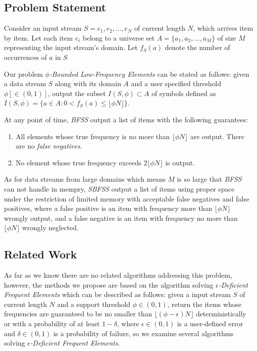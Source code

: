 \documentclass[conference]{IEEEtran}
\begin{document}
\subsection{Problem Statement}
Consider an input stream $S = e_1,e_2,..., e_N$ of current length $N$, which arrives item by item. Let each item $e_i$ belong to a universe set $A=\{a_1,a_2,...,a_M\}$ of size $M$ representing the input stream's domain. Let $f_S(a)$ denote the number of occurrences of $a$ in $S$\par

Our problem $\phi$\emph{-Bounded Low-Frequency Elements} can be stated as follows: given a data stream $S$ along with its domain $A$ and a user specified threshold $\phi[\in (0,1)]$, output the subset $I(S,\phi) \subset A$ of symbols defined as $I(S,\phi) = \{a\in A : 0 < f_S(a)\leq\lfloor \phi N\rfloor\}$.\par

At any point of time, \emph{BFSS} output a list of items with the following guarantees: 
\begin{enumerate}
\item  All elements whose true frequency is no more than $\lfloor\phi N\rfloor$ are output. There are no \emph{false negatives}.
\item  No element whose true frequency exceeds $2\lfloor\phi N\rfloor$ is output.
\end{enumerate} 

As for data streams from large domains which means $M$ is so large that \emph{BFSS} can not handle in mempry, \emph{SBFSS} output a list of items using proper space under the restriction of limited memory with acceptable false negatives and false positives, where a false positive is an item with frequency more than $\lfloor\phi N\rfloor$ wrongly output, and a false negative is an item with frequency no more than $\lfloor\phi N\rfloor$ wrongly neglected.

\subsection{Related Work}
As far as we know there are no related algorithms addressing this problem, however, the methods we propose are based on the algorithm solving $\epsilon$\emph{-Deficient Frequent Elements} which can be described as follows: given a input stream $S$ of current length $N$ and a support threshold $\phi \in (0,1)$, return the items whose frequencies are guaranteed to be no smaller than $\lfloor(\phi-\epsilon)N\rfloor$ deterministically or with a probability of at least $1-\delta$, where $\epsilon \in (0,1)$ is a user-defined error and $\delta \in (0,1)$ is a probability of failure, so we examine several algorithms solving $\epsilon$\emph{-Deficient Frequent Elements}.\par
\end{document}

